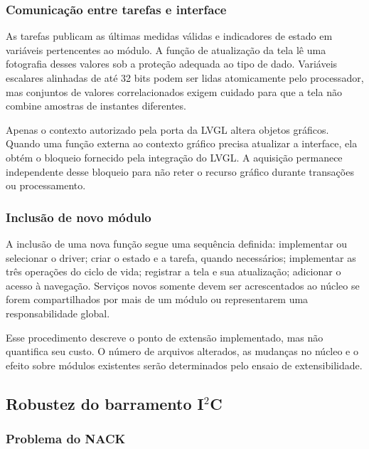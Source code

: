 \documentclass[a4paper,12pt]{article}
\begin{document}
\subsubsection{Comunica\c{c}\~ao entre tarefas e interface}


As tarefas publicam as \'ultimas medidas v\'alidas e indicadores de estado em vari\'aveis pertencentes ao m\'odulo. A fun\c{c}\~ao de atualiza\c{c}\~ao da tela l\^e uma fotografia desses valores sob a prote\c{c}\~ao adequada ao tipo de dado. Vari\'aveis escalares alinhadas de at\'e 32 bits podem ser lidas atomicamente pelo processador, mas conjuntos de valores correlacionados exigem cuidado para que a tela n\~ao combine amostras de instantes diferentes.


Apenas o contexto autorizado pela porta da LVGL altera objetos gr\'aficos. Quando uma fun\c{c}\~ao externa ao contexto gr\'afico precisa atualizar a interface, ela obt\'em o bloqueio fornecido pela integra\c{c}\~ao do LVGL. A aquisi\c{c}\~ao permanece independente desse bloqueio para n\~ao reter o recurso gr\'afico durante transa\c{c}\~oes ou processamento.


\subsubsection{Inclus\~ao de novo m\'odulo}


A inclus\~ao de uma nova fun\c{c}\~ao segue uma sequ\^encia definida: implementar ou selecionar o driver; criar o estado e a tarefa, quando necess\'arios; implementar as tr\^es opera\c{c}\~oes do ciclo de vida; registrar a tela e sua atualiza\c{c}\~ao; adicionar o acesso \`a navega\c{c}\~ao. Servi\c{c}os novos somente devem ser acrescentados ao n\'ucleo se forem compartilhados por mais de um m\'odulo ou representarem uma responsabilidade global.


Esse procedimento descreve o ponto de extens\~ao implementado, mas n\~ao quantifica seu custo. O n\'umero de arquivos alterados, as mudan\c{c}as no n\'ucleo e o efeito sobre m\'odulos existentes ser\~ao determinados pelo ensaio de extensibilidade.


\subsection{Robustez do barramento I$^2$C}


\subsubsection{Problema do NACK}
\end{document}
